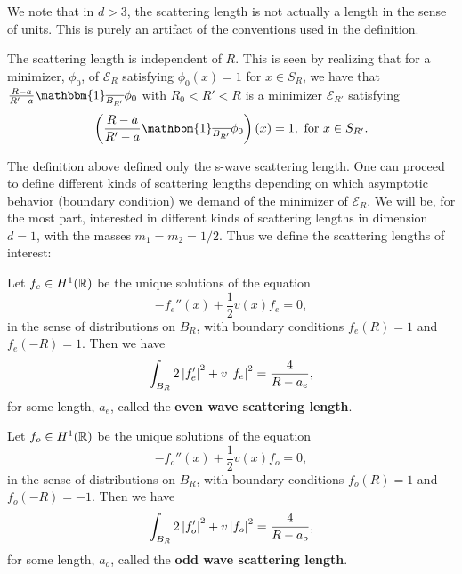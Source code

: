 We note that in $ d>3 $, the scattering length is not actually a length in the sense of units. This is purely an artifact of the conventions used in the definition.\\
\begin{remark}
	The scattering length is independent of $R$. This is seen by realizing that for a minimizer, $\phi_0$, of $\mathcal{E}_R$ satisfying $\phi_0(x)=1$ for $ x\in S_R $, we have that $\frac{R-a}{R'-a}\mathbbm{1}_{\overline{B_{R'}}}\phi_0$ with $R_0<R'<R$ is a minimizer $\mathcal{E}_{R'}$ satisfying $$\left(\frac{R-a}{R'-a}\mathbbm{1}_{\overline{B_{R'}}}\phi_0\right)(x)=1,\text{ for }x\in S_{R'}.$$
\end{remark}
The definition above defined only the s-wave scattering length. One can proceed to define different kinds of scattering lengths depending on which asymptotic behavior (boundary condition) we demand of the minimizer of $ \mathcal{E}_R $. We will be, for the most part, interested in different kinds of scattering lengths in dimension $ d=1 $, with the masses $ m_1=m_2=1/2 $. Thus we define the scattering lengths of interest:
\begin{definition}\label{DefinitionEvenScatteringLength}
	Let $ f_e\in H^1(\mathbb{R}) $ be the unique solutions of the equation\begin{equation}\label{EqEvenScatteringEquation}
	-f_e''(x)+\frac{1}{2}v(x)f_e=0,
	\end{equation}
	in the sense of distributions on $ B_R $, with boundary conditions $ f_e(R)=1 $ and $ f_e(-R)=1 $. Then we have \begin{equation}
	\int_{B_R} 2\left\lvert f_e' \right\rvert^2+v \left\lvert f_e \right\rvert^2=\frac{4}{R-a_e},
	\end{equation} 
	for some length, $ a_e $, called the \textbf{even wave scattering length}.
\end{definition}
\begin{definition}\label{DefinitionOddScatteringLenght}
	Let $ f_o\in H^1(\mathbb{R}) $ be the unique solutions of the equation\begin{equation}\label{EqOddScatteringEquation}
	-f_o''(x)+\frac{1}{2}v(x)f_o=0,
	\end{equation}
	in the sense of distributions on $ B_R $, with boundary conditions $ f_o(R)=1 $ and $ f_o(-R)=-1 $. Then we have \begin{equation}
	\int_{B_R} 2\left\lvert f_o' \right\rvert^2+v \left\lvert f_o \right\rvert^2=\frac{4}{R-a_o},
	\end{equation} 
	for some length, $ a_o $, called the \textbf{odd wave scattering length}.
\end{definition}
